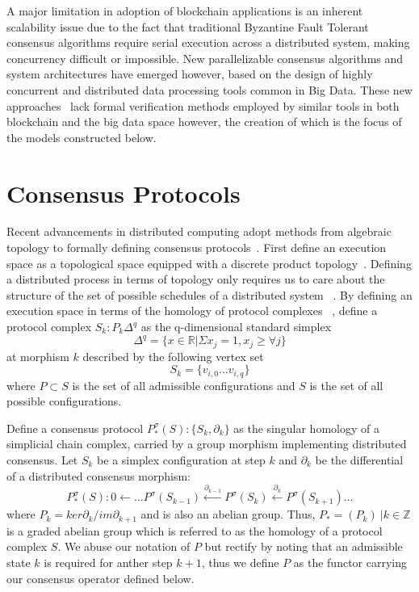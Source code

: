 \documentclass[runningheads]{llncs}
\begin{document}
A major limitation in adoption of blockchain applications is an inherent scalability issue due to the fact that traditional Byzantine Fault Tolerant consensus algorithms require serial execution across a distributed system, making concurrency difficult or impossible. New parallelizable consensus algorithms and system architectures have emerged however, based on the design of highly concurrent and distributed data processing tools common in Big Data. These new approaches~\cite{ref_url3,ref_url6} lack formal verification methods employed by similar tools in both blockchain and the big data space however, the creation of which is the focus of the models constructed below.

\section{Consensus Protocols}
Recent advancements in distributed computing adopt methods from algebraic topology to formally defining consensus protocols~\cite{ref_article1,ref_article2}. First define an execution space as a topological space equipped with a discrete product topology~\cite{ref_article3}. Defining a distributed process in terms of topology only requires us to care about the structure of the set of possible schedules of a distributed system ~\cite{ref_article4}. By defining an execution space in terms of the homology of protocol complexes ~\cite{ref_article2}, define a protocol complex $S_k: P_k{\Delta^q}$ as the q-dimensional standard simplex
\begin{equation}
\Delta^q = \{x \in \mathbb{R} | \Sigma x_j = 1, x_j \geq \forall j \}
\end{equation} 
at morphism $k$ described by the following vertex set
\begin{equation}
S_k = \{v_{i,0} \dots v_{i,q}\}
\end{equation}
where $P \subset S$ is the set of all admissible configurations and $S$ is the set of all possible configurations.

Define a consensus protocol $P^\sigma_{*}(S):\{S_k, \partial_k\}$ as the singular homology of a simplicial chain complex, carried by a group morphism implementing distributed consensus. Let $S_k$ be a simplex configuration at step $k$ and $\partial_k$ be the differential of a distributed consensus morphism:
\begin{equation}
P^\sigma_{*}(S): 0 \leftarrow \dots P^\sigma(S_{k-1})\xleftarrow {\partial_{k-1}} P^\sigma(S_{k})\xleftarrow {\partial_{k}} P^\sigma(S_{k+1}) \dots
\end{equation}
where $P_k = ker \partial_k / im \partial_{k+1}$ and is also an abelian group. Thus, $P_*= (P_k) \ | k \in \mathbb{Z}$ is a graded abelian group which is referred to as the homology of a protocol complex $S$. We abuse our notation of $P$ but rectify by noting that an admissible state $k$ is required for anther step $k + 1$, thus we define $P$ as the functor carrying our consensus operator defined below.
\end{document}
